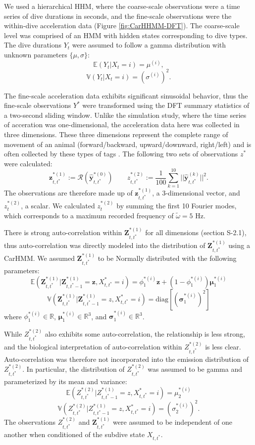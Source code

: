 We used a hierarchical HHM, where the coarse-scale observations were a time series of dive durations in seconds, and the fine-scale observations were the within-dive acceleration data (Figure \ref{fig:CarHHMM-DFT}). The coarse-scale level was comprised of an HMM with hidden states corresponding to dive types. The dive durations $Y_t$ were assumed to follow a gamma distribution with unknown parameters $\{\mu,\sigma\}$:
$$\mathbb{E}(Y_t|X_t = i) = \mu^{(i)},$$
$$\mathbb{V}(Y_t|X_t = i) = \left(\sigma^{(i)}\right)^2.$$

The fine-scale acceleration data exhibits significant sinusoidal behavior, thus the fine-scale observations $Y^*$ were transformed using the DFT summary statistics of a two-second sliding window. Unlike the simulation study, where the time series of acceration was one-dimensional, the acceleration data here was collected in three dimensions. These three dimensions represent the complete range of movement of an animal (forward/backward, upward/downward, right/left) and is often collected by these types of tags \citep{Cade:2017,Fehlmann:2017,Wright:2017}. The following two sets of observations $z^*$ were calculated:
%
$$\mathbf{z}_{t,t^*}^{*(1)} := \mathcal{R}\left(\hat{\mathbf{y}}^{*(0)}_{t,t^*}\right) \qquad z_{t,t^*}^{*(2)} := \frac{1}{100}\sum_{k=1}^{10}||\hat{\mathbf{y}}^{(k)}_{t,t^*}||^2.$$
The observations are therefore made up of $\mathbf{z}_{t,t^*}^{*(1)}$, a 3-dimensional vector, and $z_t^{*(2)}$, a scalar. We calculated $z_t^{*(2)}$ by summing the first 10 Fourier modes, which corresponds to a maximum recorded frequency of $\tilde \omega = 5$ Hz. 

There is strong auto-correlation within $\mathbf{Z}^{*(1)}_{t,t^*}$ for all dimensions (section S-2.1), thus auto-correlation was directly modeled into the distribution of $\mathbf{Z}^{*(1)}_{t,t^*}$ using a CarHMM. We assumed $\mathbf{Z}^{*(1)}_{t,t^*}$ to be Normally distributed with the following parameters:
%
$$\mathbb{E}(\mathbf{Z}^{*(1)}_{t,t^*}|\mathbf{Z}^{*(1)}_{t,t^*-1} = \mathbf{z}, X^*_{t,t^*} = i) = \phi_1^{*(i)} \mathbf{z} + (1-\phi_1^{*(i)}) \mathbf{\mu}_1^{*(i)}$$
$$\mathbb{V}(\mathbf{Z}^{*(1)}_{t,t^*}|\mathbf{Z}^{*(1)}_{t,t^*-1} = z,X^*_{t,t^*} = i) = \text{diag}\left[\left(\mathbf{\sigma}_1^{*(i)}\right)^2\right]$$
%
where $\phi_1^{*(i)} \in \mathbb{R}$, $\mathbf{\mu}_1^{*(i)} \in \mathbb{R}^3$, and $\mathbf{\sigma}_1^{*(i)} \in \mathbb{R}^3$.

While $Z^{*(2)}_{t,t^*}$ also exhibits some auto-correlation, the relationship is less strong, and the biological interpretation of auto-correlation within $Z^{*(2)}_{t,t^*}$ is less clear. Auto-correlation was therefore not incorporated into the emission distribution of $Z^{*(2)}_{t,t^*}$. In particular, the distribution of $Z^{*(2)}_{t,t^*}$ was assumed to be gamma and parameterized by its mean and variance:
%
$$\mathbb{E}(Z^{*(2)}_{t,t^*}|Z^{*(1)}_{t,t^*-1} = z,X^*_{t,t^*} = i) = \mu_2^{*(i)}$$
$$\mathbb{V}(Z^{*(2)}_{t,t^*}|Z^{*(1)}_{t,t^*-1} = z,X^*_{t,t^*} = i) = \left(\sigma_2^{*(i)}\right)^2.$$
%
The observations $Z^{*(2)}_{t,t^*}$ and $\mathbf{Z}^{*(1)}_{t,t^*}$ were assumed to be independent of one another when conditioned of the subdive state $X_{t,t^*}$.

